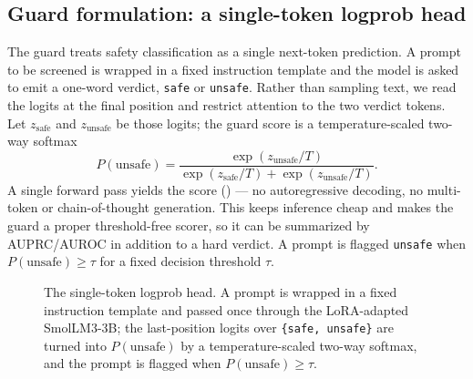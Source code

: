 \documentclass[sigconf,nonacm]{acmart}
\begin{document}
\subsection{Guard formulation: a single-token logprob head}

The guard treats safety classification as a single next-token prediction. A prompt to be screened is wrapped in a fixed instruction template and the model is asked to emit a one-word verdict, \texttt{safe} or \texttt{unsafe}. Rather than sampling text, we read the logits at the final position and restrict attention to the two verdict tokens. Let $z_{\text{safe}}$ and $z_{\text{unsafe}}$ be those logits; the guard score is a temperature-scaled two-way softmax
\begin{equation}
P(\text{unsafe}) = \frac{\exp(z_{\text{unsafe}}/T)}{\exp(z_{\text{safe}}/T) + \exp(z_{\text{unsafe}}/T)}.
\end{equation}
A single forward pass yields the score () --- no autoregressive decoding, no multi-token or chain-of-thought generation. This keeps inference cheap and makes the guard a proper threshold-free scorer, so it can be summarized by AUPRC/AUROC in addition to a hard verdict. A prompt is flagged \texttt{unsafe} when $P(\text{unsafe}) \ge \tau$ for a fixed decision threshold $\tau$.

\begin{figure}[t]
\centering
{}
\caption{The single-token logprob head. A prompt is wrapped in a fixed instruction template and passed once through the LoRA-adapted SmolLM3-3B; the last-position logits over \texttt{\{safe, unsafe\}} are turned into $P(\text{unsafe})$ by a temperature-scaled two-way softmax, and the prompt is flagged when $P(\text{unsafe}) \ge \tau$.}
\label{fig:logprob-head}
\end{figure}
\end{document}
